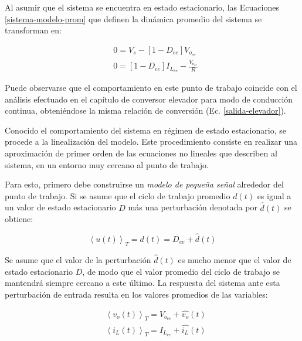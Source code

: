 Al asumir que el sistema se encuentra en estado estacionario, las Ecuaciones \ref{sistema-modelo-prom} que definen la dinámica promedio del sistema se transforman en:

\begin{equation}
  \begin{split}
    & 0 = V_s - \left[ 1-D_{ee} \right] V_{o_{ee}}
    \\
    & 0 = \left[ 1-D_{ee} \right] I_{L_{ee}} - \frac{V_{o_{ee}}}{R}
  \end{split}
  \label{sistema-modelo-ee}
\end{equation}

Puede observarse que el comportamiento en este punto de trabajo coincide con el análisis efectuado en el capítulo de conversor elevador para modo de conducción continua, obteniéndose la misma relación de conversión (Ec. \ref{salida-elevador}).

Conocido el comportamiento del sistema en régimen de estado estacionario, se procede a la linealización del modelo. Este procedimiento consiste en realizar una aproximación de primer orden de las ecuaciones no lineales que describen al sistema, en un entorno muy cercano al punto de trabajo.

Para esto, primero debe construirse un \emph{modelo de pequeña señal} alrededor del punto de trabajo. Si se asume que el ciclo de trabajo promedio $d(t)$ es igual a un valor de estado estacionario $D$ más una perturbación denotada por $\hat{d}(t)$ se obtiene:

\begin{equation}
  \left\langle u(t) \right\rangle_T = d(t) = D_{ee} + \hat{d}(t)
  \label{ciclo-lineal} 
\end{equation}

Se asume que el valor de la perturbación $\hat{d}(t)$ es mucho menor que el valor de estado estacionario $D$, de modo que el valor promedio del ciclo de trabajo se mantendrá siempre cercano a este último. La respuesta del sistema ante esta perturbación de entrada resulta en los valores promedios de las variables:

\begin{equation}
  \begin{split}
    & \left\langle v_o(t) \right\rangle_T = V_{o_{ee}} + \hat{v_o}(t)
    \\
    & \left\langle i_L(t) \right\rangle_T = I_{L_{ee}} + \hat{i_L}(t)
  \end{split}
  \label{sistema-modelo-prom-ee}
\end{equation}

